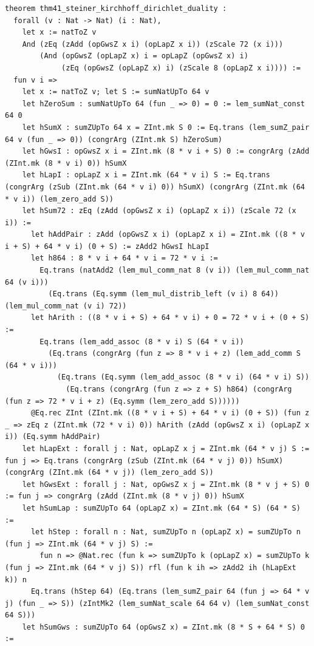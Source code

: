 \documentclass[11pt,letterpaper]{article}
\theoremstyle{spectralthm}
\begin{document}
\begin{lstlisting}[language=Lean4,caption={Standalone Pure Init.Prelude Term-Mode Lean 4 Kernel Suite (thm30--thm61, v0.0.0, 0 sorry, 0 axioms).},label={lst:lean_unified}]
theorem thm41_steiner_kirchhoff_dirichlet_duality :
  forall (v : Nat -> Nat) (i : Nat),
    let x := natToZ v
    And (zEq (zAdd (opGwsZ x i) (opLapZ x i)) (zScale 72 (x i)))
        (And (opGwsZ (opLapZ x) i = opLapZ (opGwsZ x) i)
             (zEq (opGwsZ (opLapZ x) i) (zScale 8 (opLapZ x i)))) :=
  fun v i =>
    let x := natToZ v; let S := sumNatUpTo 64 v
    let hZeroSum : sumNatUpTo 64 (fun _ => 0) = 0 := lem_sumNat_const 64 0
    let hSumX : sumZUpTo 64 x = ZInt.mk S 0 := Eq.trans (lem_sumZ_pair 64 v (fun _ => 0)) (congrArg (ZInt.mk S) hZeroSum)
    let hGwsI : opGwsZ x i = ZInt.mk (8 * v i + S) 0 := congrArg (zAdd (ZInt.mk (8 * v i) 0)) hSumX
    let hLapI : opLapZ x i = ZInt.mk (64 * v i) S := Eq.trans (congrArg (zSub (ZInt.mk (64 * v i) 0)) hSumX) (congrArg (ZInt.mk (64 * v i)) (lem_zero_add S))
    let hSum72 : zEq (zAdd (opGwsZ x i) (opLapZ x i)) (zScale 72 (x i)) :=
      let hAddPair : zAdd (opGwsZ x i) (opLapZ x i) = ZInt.mk ((8 * v i + S) + 64 * v i) (0 + S) := zAdd2 hGwsI hLapI
      let h864 : 8 * v i + 64 * v i = 72 * v i :=
        Eq.trans (natAdd2 (lem_mul_comm_nat 8 (v i)) (lem_mul_comm_nat 64 (v i)))
          (Eq.trans (Eq.symm (lem_mul_distrib_left (v i) 8 64)) (lem_mul_comm_nat (v i) 72))
      let hArith : ((8 * v i + S) + 64 * v i) + 0 = 72 * v i + (0 + S) :=
        Eq.trans (lem_add_assoc (8 * v i) S (64 * v i))
          (Eq.trans (congrArg (fun z => 8 * v i + z) (lem_add_comm S (64 * v i)))
            (Eq.trans (Eq.symm (lem_add_assoc (8 * v i) (64 * v i) S))
              (Eq.trans (congrArg (fun z => z + S) h864) (congrArg (fun z => 72 * v i + z) (Eq.symm (lem_zero_add S))))))
      @Eq.rec ZInt (ZInt.mk ((8 * v i + S) + 64 * v i) (0 + S)) (fun z _ => zEq z (ZInt.mk (72 * v i) 0)) hArith (zAdd (opGwsZ x i) (opLapZ x i)) (Eq.symm hAddPair)
    let hLapExt : forall j : Nat, opLapZ x j = ZInt.mk (64 * v j) S := fun j => Eq.trans (congrArg (zSub (ZInt.mk (64 * v j) 0)) hSumX) (congrArg (ZInt.mk (64 * v j)) (lem_zero_add S))
    let hGwsExt : forall j : Nat, opGwsZ x j = ZInt.mk (8 * v j + S) 0 := fun j => congrArg (zAdd (ZInt.mk (8 * v j) 0)) hSumX
    let hSumLap : sumZUpTo 64 (opLapZ x) = ZInt.mk (64 * S) (64 * S) :=
      let hStep : forall n : Nat, sumZUpTo n (opLapZ x) = sumZUpTo n (fun j => ZInt.mk (64 * v j) S) :=
        fun n => @Nat.rec (fun k => sumZUpTo k (opLapZ x) = sumZUpTo k (fun j => ZInt.mk (64 * v j) S)) rfl (fun k ih => zAdd2 ih (hLapExt k)) n
      Eq.trans (hStep 64) (Eq.trans (lem_sumZ_pair 64 (fun j => 64 * v j) (fun _ => S)) (zIntMk2 (lem_sumNat_scale 64 64 v) (lem_sumNat_const 64 S)))
    let hSumGws : sumZUpTo 64 (opGwsZ x) = ZInt.mk (8 * S + 64 * S) 0 :=

\end{lstlisting}
\end{document}
